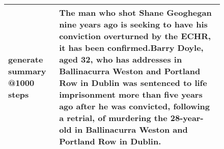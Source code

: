\documentclass[11pt,a4paper]{article}
\begin{document}
\begin{figure*}[t]
\begin{adjustbox}{width=\textwidth}
\begin{tabular}{|p{}|p{}|}
    \hline
    generate summary @1000 steps & The man who shot Shane Geoghegan nine years ago is seeking to have his conviction overturned by the ECHR, it has been confirmed.Barry Doyle, aged 32, who has addresses in Ballinacurra Weston and Portland Row in Dublin was sentenced to life imprisonment more than five years ago after he was convicted, following a retrial, of murdering the 28-year-old in Ballinacurra Weston and Portland Row in Dublin.\\
    \hline
    \end{tabular}
    \end{adjustbox}

    \end{figure*}
\end{document}

